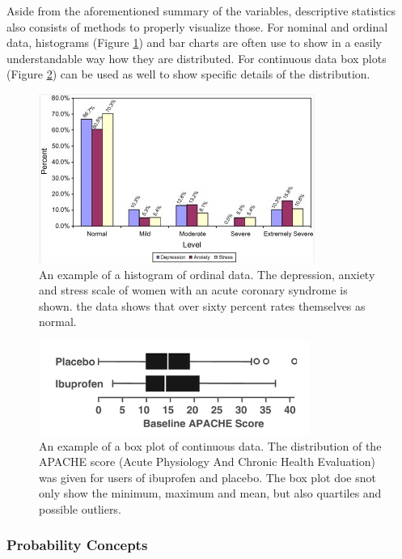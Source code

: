 \documentclass[10pt,a4paper]{article}
\begin{document}
	Aside from the aforementioned summary of the variables, descriptive statistics also consists of methods to properly visualize those. For nominal and ordinal data, histograms (Figure \ref{fig:HistEx}) and bar charts are often use to show in a easily understandable way how they are distributed. For continuous data box plots (Figure \ref{fig:BoxEx}) can be used as well to show specific details of the distribution. \cite{dupont2009statistical}
	
	\begin{figure}[h!]
		\includegraphics{HistogramExample.PNG}
		\caption{An example of a histogram of ordinal data. The depression, anxiety and stress scale of women with an acute coronary syndrome is shown. the data shows that over sixty percent rates themselves as normal. \cite{FISHER200993}}
		\label{fig:HistEx}
	\end{figure}

	\begin{figure}[h!]
	\includegraphics{BoxplotExample.PNG}
	\caption{An example of a box plot of continuous data. The distribution of the APACHE score (Acute Physiology And Chronic Health Evaluation) was given for users of ibuprofen and placebo. The box plot doe snot only show the minimum, maximum and mean, but also quartiles and possible outliers. \cite{dupont2009statistical}}
	\label{fig:BoxEx}
	\end{figure}
	
	\subsubsection{Probability Concepts}
	
\end{document}
